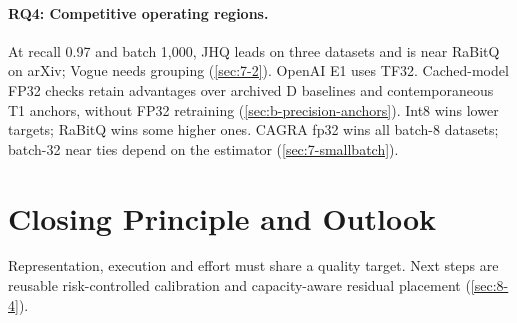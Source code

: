 \paragraph{RQ4: Competitive operating regions.}
At recall 0.97 and batch 1,000, JHQ leads on three datasets and is near RaBitQ on arXiv; Vogue needs grouping (\cref{sec:7-2}). OpenAI E1 uses TF32. Cached-model FP32 checks retain advantages over archived D baselines and contemporaneous T1 anchors, without FP32 retraining (\cref{sec:b-precision-anchors}). Int8 wins lower targets; RaBitQ wins some higher ones. CAGRA fp32 wins all batch-8 datasets; batch-32 near ties depend on the estimator (\cref{sec:7-smallbatch}).

\section{Closing Principle and Outlook}
\label{sec:9-2}
Representation, execution and effort must share a quality target. Next steps are reusable risk-controlled calibration and capacity-aware residual placement (\cref{sec:8-4}).